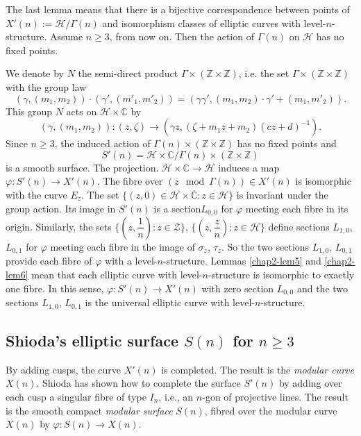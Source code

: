 The last lemma means that there is a bijective correspondence between
points of $X'(n):=\mathscr{H}/\Gamma(n)$ and isomorphism classes of
elliptic curves with level-$n$-structure. Assume $n\geq 3$, from now
on. Then the action of $\Gamma(n)$ on $\mathscr{H}$ has no fixed
points.

We denote by $N$ the semi-direct product $\Gamma\times
(\mathbb{Z}\times \mathbb{Z})$, i.e. the set $\Gamma\times
(\mathbb{Z}\times \mathbb{Z})$ with the group law
$$
(\gamma,(m_{1},m_{2}))\cdot
(\gamma',(m'_{1},m'_{2}))=(\gamma\gamma',(m_{1},m_{2})\cdot \gamma'+(m_{1},m'_{2})). 
$$
This group $N$ acts on $\mathscr{H}\times \mathbb{C}$ by
\begin{equation}
(\gamma,(m_{1},m_{2})):(z,\zeta)\to (\gamma
z,(\zeta+m_{1}z+m_{2})(cz+d)^{-1}). \label{chap2-eq21}
\end{equation}
Since $n\geq 3$, the induced action of $\Gamma(n)\times
(\mathbb{Z}\times \mathbb{Z})$ has no fixed points and
$$
S'(n)=\mathscr{H}\times \mathbb{C}/\Gamma(n)\times
(\mathbb{Z}\times \mathbb{Z}) 
$$
is a smooth surface. The
projection. $\mathscr{H}\times \mathbb{C}\to \mathscr{H}$ induces a
map $\varphi:S'(n)\to X'(n)$. The fibre over $(z\mod \Gamma(n))\in
X'(n)$ is isomorphic with the curve $E_{z}$. The set
$\{(z,0)\in \mathscr{H}\times \mathbb{C}:z\in \mathscr{H}\}$ is
invariant under the group action. Its image in $S'(n)$ is a
section\pageoriginale $L_{0,0}$ for $\varphi$ meeting each fibre in
its origin. Similarly, the sets
$\{(z,\dfrac{1}{n}):z\in \mathscr{Z}\}$,
$\{(z,\dfrac{z}{n}):z\in \mathscr{H}\}$ define sections $L_{1,0}$,
$L_{0,1}$ for $\varphi$ meeting each fibre in the image of
$\sigma_{z}$, $\tau_{z}$. So the two sections $L_{1,0}$, $L_{0,1}$
provide each fibre of $\varphi$ with a
level-$n$-structure. Lemmas \ref{chap2-lem5} and \ref{chap2-lem6} mean
that each elliptic curve with level-$n$-structure is isomorphic to
exactly one fibre. In this sense, $\varphi:S'(n)\to X'(n)$ with zero
section $L_{0,0}$ and the two sections $L_{1,0}$, $L_{0,1}$ is the
universal elliptic curve with level-$n$-structure. 

\subsection{Shioda's elliptic surface \texorpdfstring{$S(n)$}{Sn} for \texorpdfstring{$n\geq 3$}{n3}}\label{chap2-sec4.2} 

By adding cusps, the curve $X'(n)$ is completed. The result is the
{\em modular curve} $X(n)$. Shioda \cite[p.38]{chap2-key11} has shown
how to complete the surface $S'(n)$ by adding over each cusp a
singular fibre of type $I_{n}$, i.e., an $n$-gon of projective
lines. The result is the smooth compact {\em modular surface} $S(n)$,
fibred over the modular curve $X(n)$ by $\varphi:S(n)\to X(n)$.

